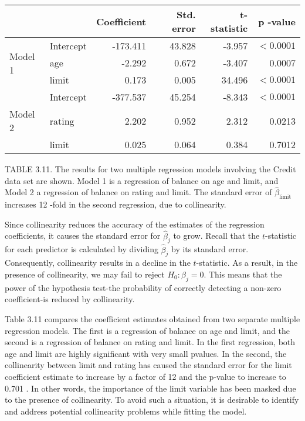 \documentclass[10pt]{article}
\begin{document}

\begin{center}
\begin{tabular}{ll|rrrr}
\hline
 &  & Coefficient & Std. error & t-statistic & p -value \\
\hline
\multirow{3}{*}{Model 1} & Intercept & -173.411 & 43.828 & -3.957 & $<0.0001$ \\
 & age & -2.292 & 0.672 & -3.407 & 0.0007 \\
 & limit & 0.173 & 0.005 & 34.496 & $<0.0001$ \\
\hline
 & Intercept & -377.537 & 45.254 & -8.343 & $<0.0001$ \\
Model 2 & rating & 2.202 & 0.952 & 2.312 & 0.0213 \\
 & limit & 0.025 & 0.064 & 0.384 & 0.7012 \\
\hline
\end{tabular}
\end{center}

TABLE 3.11. The results for two multiple regression models involving the Credit data set are shown. Model 1 is a regression of balance on age and limit, and Model 2 a regression of balance on rating and limit. The standard error of $\hat{\beta}_{\text {limit }}$ increases 12 -fold in the second regression, due to collinearity.

Since collinearity reduces the accuracy of the estimates of the regression coefficients, it causes the standard error for $\hat{\beta}_{j}$ to grow. Recall that the $t$-statistic for each predictor is calculated by dividing $\hat{\beta}_{j}$ by its standard error. Consequently, collinearity results in a decline in the $t$-statistic. As a result, in the presence of collinearity, we may fail to reject $H_{0}: \beta_{j}=0$. This means that the power of the hypothesis test-the probability of correctly detecting a non-zero coefficient-is reduced by collinearity.

Table 3.11 compares the coefficient estimates obtained from two separate multiple regression models. The first is a regression of balance on age and limit, and the second is a regression of balance on rating and limit. In the first regression, both age and limit are highly significant with very small pvalues. In the second, the collinearity between limit and rating has caused the standard error for the limit coefficient estimate to increase by a factor of 12 and the p-value to increase to 0.701 . In other words, the importance of the limit variable has been masked due to the presence of collinearity. To avoid such a situation, it is desirable to identify and address potential collinearity problems while fitting the model.
\end{document}
